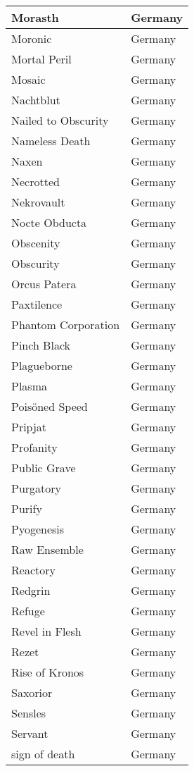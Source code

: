 \documentclass[12pt, a4paper, twoside]{report}
\begin{document}
\begin{center}
\begin{longtable}{|p{5cm}|p{5cm}|}
Morasth & Germany \\ \hline
Moronic & Germany \\ \hline
Mortal Peril & Germany \\ \hline
Mosaic & Germany \\ \hline
Nachtblut & Germany \\ \hline
Nailed to Obscurity & Germany \\ \hline
Nameless Death & Germany \\ \hline
Naxen & Germany \\ \hline
Necrotted & Germany \\ \hline
Nekrovault & Germany \\ \hline
Nocte Obducta & Germany \\ \hline
Obscenity & Germany \\ \hline
Obscurity & Germany \\ \hline
Orcus Patera & Germany \\ \hline
Paxtilence & Germany \\ \hline
Phantom Corporation & Germany \\ \hline
Pinch Black & Germany \\ \hline
Plagueborne & Germany \\ \hline
Plasma & Germany \\ \hline
Poisöned Speed & Germany \\ \hline
Pripjat & Germany \\ \hline
Profanity & Germany \\ \hline
Public Grave & Germany \\ \hline
Purgatory & Germany \\ \hline
Purify & Germany \\ \hline
Pyogenesis & Germany \\ \hline
Raw Ensemble & Germany \\ \hline
Reactory & Germany \\ \hline
Redgrin & Germany \\ \hline
Refuge & Germany \\ \hline
Revel in Flesh & Germany \\ \hline
Rezet & Germany \\ \hline
Rise of Kronos & Germany \\ \hline
Saxorior & Germany \\ \hline
Sensles & Germany \\ \hline
Servant & Germany \\ \hline
sign of death & Germany \\ \hline

\end{longtable}
\end{center}
\end{document}

